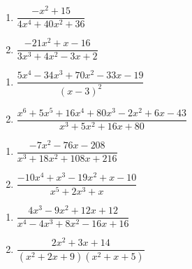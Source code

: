 \begin{multicols}{2}
\begin{enumerate}
\setcounter{enumi}{\value{HW}}

\item $\dfrac{-x^{2} + 15}{4x^{4} + 40x^{2} + 36}$
\item $\dfrac{-21x^{2} + x - 16}{3x^{3} + 4x^{2} - 3x + 2}$


\setcounter{HW}{\value{enumi}}
\end{enumerate}
\end{multicols}

\begin{multicols}{2}
\begin{enumerate}
\setcounter{enumi}{\value{HW}}

\item $\dfrac{5x^{4} - 34x^{3} + 70x^{2} - 33x - 19}{(x - 3)^{2}}$
\item $\dfrac{x^{6} + 5x^{5} + 16x^{4} + 80x^{3} - 2x^{2} + 6x - 43}{x^{3} + 5x^{2} + 16x + 80}$


\setcounter{HW}{\value{enumi}}
\end{enumerate}
\end{multicols}

\begin{multicols}{2}
\begin{enumerate}
\setcounter{enumi}{\value{HW}}

\item $\dfrac{-7x^{2} - 76x - 208}{x^{3} + 18x^{2} + 108x + 216}$
\item $\dfrac{-10x^{4} + x^{3} - 19x^{2} + x - 10}{x^{5} + 2x^{3} + x}$


\setcounter{HW}{\value{enumi}}
\end{enumerate}
\end{multicols}

\begin{multicols}{2}
\begin{enumerate}
\setcounter{enumi}{\value{HW}}

\item $\dfrac{4x^{3} - 9x^{2} + 12x + 12}{x^{4} - 4x^{3} + 8x^{2} - 16x + 16}$
\item $\dfrac{2x^{2} + 3x + 14}{(x^{2} + 2x + 9)(x^{2} + x + 5)}$ \label{findparfraclast}

\setcounter{HW}{\value{enumi}}
\end{enumerate}
\end{multicols}

